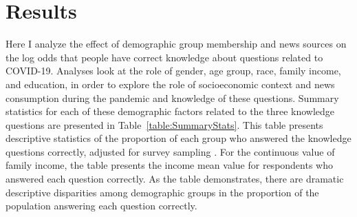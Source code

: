 \documentclass[11pt]{article}
\begin{document}





\section{Results}\label{sec:results}

Here I analyze the effect of demographic group membership and news sources on the log odds that people have correct knowledge about questions related to COVID-19. Analyses look at the role of gender, age group, race, family income, and education, in order to explore the role of socioeconomic context and news consumption during the pandemic and knowledge of these questions. 
Summary statistics for each of these demographic factors related to the three knowledge questions are presented in Table~\ref{table:SummaryStats}. This table presents descriptive statistics of the proportion of each group who answered the knowledge questions correctly, adjusted for survey sampling \citep{UCLASurveyDataAnalysis}. For the continuous value of family income, the table presents the income mean value for respondents who answered each question correctly. As the table demonstrates, there are dramatic descriptive disparities among demographic groups in the proportion of the population answering each question correctly.
\end{document}
